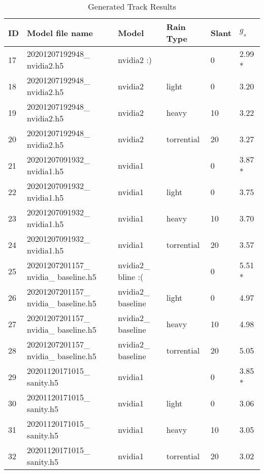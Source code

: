 \begin{table}
  \caption{Generated Track Results}
  \label{generated-track-table}
  \centering
  \begin{tabular}{llllll}
    \toprule
    ID & Model file name & Model & Rain Type & Slant & $g_s$ \\ 
    \midrule
    17 & 20201207192948\_ nvidia2.h5 & nvidia2 :) &  & 0 & 2.99 * \\   %
    18 & 20201207192948\_ nvidia2.h5 & nvidia2 & light & 0 & 3.20 \\ 
    19 & 20201207192948\_ nvidia2.h5 & nvidia2 & heavy & 10 & 3.22 \\ 
    20 & 20201207192948\_ nvidia2.h5 & nvidia2 & torrential & 20 & 3.27 \\ 
    21 & 20201207091932\_ nvidia1.h5 & nvidia1 &  & 0 & 3.87 * \\ 
    22 & 20201207091932\_ nvidia1.h5 & nvidia1 & light & 0 & 3.75 \\ 
    23 & 20201207091932\_ nvidia1.h5 & nvidia1 & heavy & 10 & 3.70 \\ 
    24 & 20201207091932\_ nvidia1.h5 & nvidia1 & torrential & 20 & 3.57 \\ 
    25 & 20201207201157\_ nvidia\_ baseline.h5 & nvidia2\_ bline :( &  & 0 & 5.51 * \\ 
    26 & 20201207201157\_ nvidia\_ baseline.h5 & nvidia2\_ baseline & light & 0 & 4.97 \\ 
    27 & 20201207201157\_ nvidia\_ baseline.h5 & nvidia2\_ baseline & heavy & 10 & 4.98 \\ 
    28 & 20201207201157\_ nvidia\_ baseline.h5 & nvidia2\_ baseline & torrential & 20 & 5.05 \\ 
    29 & 20201120171015\_ sanity.h5 & nvidia1 &  & 0 & 3.85 * \\ 
    30 & 20201120171015\_ sanity.h5 & nvidia1 & light & 0 & 3.06 \\ 
    31 & 20201120171015\_ sanity.h5 & nvidia1 & heavy & 10 & 3.05 \\ 
    32 & 20201120171015\_ sanity.h5 & nvidia1 & torrential & 20 & 3.02 \\ 
    \bottomrule
  \end{tabular}
\end{table}

